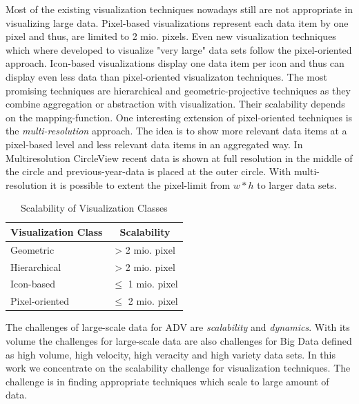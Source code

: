 Most of the existing visualization techniques nowadays still are not appropriate in visualizing large data. Pixel-based visualizations represent each data item by one pixel and thus, are limited to 2 mio. pixels. Even new visualization techniques which where developed to visualize "very large" data sets follow the pixel-oriented approach\cite{Keim1995, Keim1996}. Icon-based visualizations display one data item per icon and thus can display even less data than pixel-oriented visualizaton techniques. The most promising techniques are hierarchical and geometric-projective techniques as they combine aggregation or abstraction with visualization. Their scalability depends on the mapping-function. 
One interesting extension of pixel-oriented techniques is the \textit{multi-resolution} approach\cite{Keim2005}. The idea is to show more relevant data items at a pixel-based level and less relevant data items in an aggregated way. In Multiresolution CircleView recent data is shown at full resolution in the middle of the circle and previous-year-data is placed at the outer circle. With multi-resolution it is possible to extent the pixel-limit from $w*h$ to larger data sets. 

\begin{table}[H]
	\centering
	\caption{Scalability of Visualization Classes}
	\label{vizScalability}
	\begin{tabu}{ l | c }
	\toprule
	Visualization Class & Scalability\\
	\midrule
	Geometric &   > 2 mio. pixel\\
	Hierarchical &  > 2 mio. pixel \\
	Icon-based &  $\leq$ 1 mio. pixel \\
	Pixel-oriented &  $\leq$ 2 mio. pixel \\	
	\bottomrule
	\end{tabu}
\end{table}






 The challenges of large-scale data for ADV are \textit{scalability} and \textit{dynamics}\cite{Wang2015}. With its volume the challenges for large-scale data are also challenges for Big Data defined as high volume, high velocity, high veracity and high variety data sets\cite{Wang2015}. In this work we concentrate on the scalability challenge for visualization techniques. The challenge is in finding appropriate techniques\cite{Aigner2008,Keim2005} which scale to large amount of data.
 
